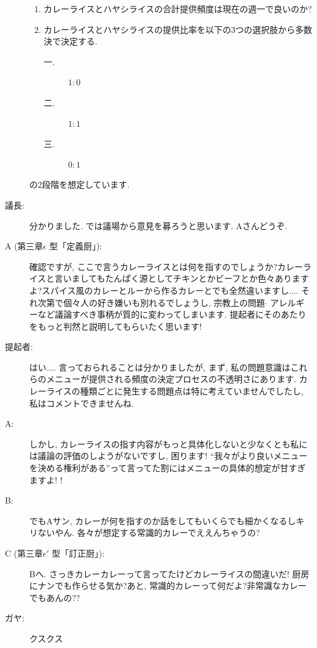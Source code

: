 \documentclass[10pt,b5jsbook,dvips,dvipdfmx,openany]{jsbook}
\theoremstyle{definition}
\begin{document}
\begin{multicols}{2}
\begin{description}
		\begin{enumerate}
		\item カレーライスとハヤシライスの合計提供頻度は現在の週一で良いのか?
		\item カレーライスとハヤシライスの提供比率を以下の3つの選択肢から多数決で決定する.
			\begin{description}
			\item[一. ] $1:0$
			\item[二. ] $1:1$
			\item[三. ] $0:1$
			\end{description}
		\end{enumerate}
		の2段階を想定しています.

		\item[議長: ] 分かりました. では議場から意見を募ろうと思います. Aさんどうぞ.

		\item[A (第三章$ \epsilon $ 型「定義厨」): ]確認ですが, ここで言うカレーライスとは何を指すのでしょうか?カレーライスと言いましてもたんぱく源としてチキンとかビーフとか色々ありますよ?スパイス風のカレーとルーから作るカレーとでも全然違いますし.... それ次第で個々人の好き嫌いも別れるでしょうし, 宗教上の問題$ \cdot $ アレルギーなど議論すべき事柄が質的に変わってしまいます. 提起者にそのあたりをもっと判然と説明してもらいたく思います!

		\item[提起者: ]はい.... 言っておられることは分かりましたが, まず, 私の問題意識はこれらのメニューが提供される頻度の決定プロセスの不透明さにあります. カレーライスの種類ごとに発生する問題点は特に考えていませんでしたし, 私はコメントできませんね.

		\item[A: ]しかし, カレーライスの指す内容がもっと具体化しないと少なくとも私には議論の評価のしようがないですし, 困ります! ``我々がより良いメニューを決める権利がある''って言ってた割にはメニューの具体的想定が甘すぎますよ! !

		\item[B: ]でもAサン, カレーが何を指すのか話をしてもいくらでも細かくなるしキリないやん. 各々が想定する常識的カレーでええんちゃうの?

		\item[C (第三章$ \epsilon ' $  型「訂正厨」): ] Bへ. さっきカレーカレーって言ってたけどカレーライスの間違いだ! 厨房にナンでも作らせる気か?あと, 常識的カレーって何だよ?非常識なカレーでもあんの??

		\item[ガヤ: ] クスクス


\end{description}
\end{multicols}
\end{document}
